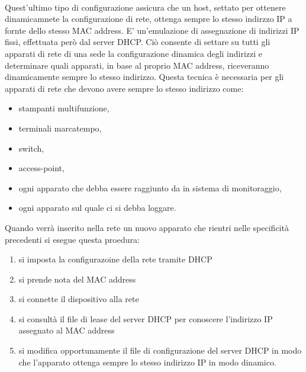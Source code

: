 \paragraph{} Quest'ultimo tipo di configurazione assicura che un host, settato per ottenere dinamicamnete la configurazione di rete, ottenga sempre lo stesso indirzzo IP a fornte dello stesso MAC address. E' un'emulazione di assegnazione di indirizzi IP fissi, effettuata però dal server DHCP. Ciò consente di settare su tutti gli apparati di rete di una sede la configurazione dinamica degli indirizzi e determinare quali apparati, in base al proprio MAC address, riceveranno dinamicamente sempre lo stesso indirizzo.
Questa tecnica è necessaria per gli apparati di rete che devono avere sempre lo stesso indirizzo come: 
\begin{itemize}
  \item stampanti multifunzione,
  \item terminali marcatempo,
  \item switch,
  \item access-point,
  \item ogni apparato che debba essere raggiunto da in sistema di monitoraggio,
  \item ogni apparato sul quale ci si debba loggare.
\end{itemize}

Quando verrà inserito nella rete un nuovo apparato che rientri nelle specificità precedenti si esegue questa proedura:
\begin{enumerate}
  \item si imposta la configurazoine della rete tramite DHCP
  \item si prende nota del MAC address
  \item si connette il dispositivo alla rete
  \item si consultà il file di lease del server DHCP per conoscere l'indirizzo IP assegnato al MAC address
  \item si modifica opportunamente il file di configurazione del server  DHCP in modo che l'apparato ottenga sempre lo stesso indirizzo IP in modo dinamico.
\end{enumerate}

